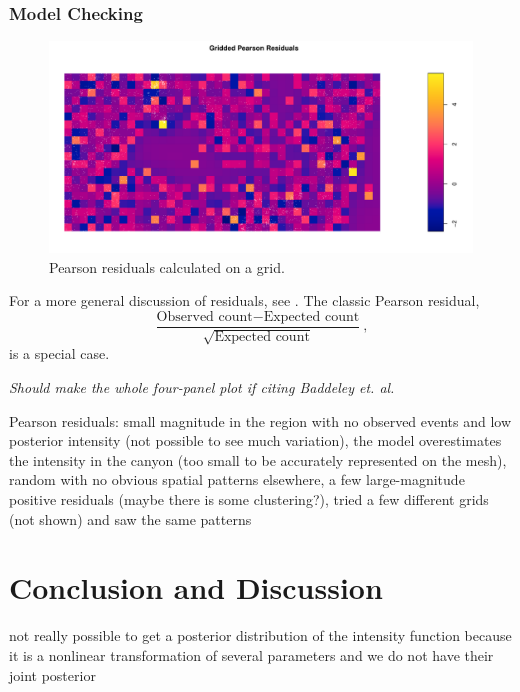 \documentclass[]{interact}
\begin{document}
\subsubsection{Model Checking}

\begin{figure}[h]
\includegraphics[width=\textwidth]{figures/beiresiduals.pdf}
\caption{Pearson residuals calculated on a grid.}
\label{beiresiduals}
\end{figure}

For a more general discussion of residuals, see \cite{baddeleyresiduals}. The
classic Pearson residual,
\begin{displaymath}
\frac{\text{Observed count} - \text{Expected count}}
{\sqrt{\text{Expected count}}},
\end{displaymath}
is a special case.

{\it Should make the whole four-panel plot if citing Baddeley et. al.}

Pearson residuals: small magnitude in the region with no observed events and low
posterior intensity (not possible to see much variation), the model
overestimates the intensity in the canyon (too small to be accurately
represented on the mesh), random with no obvious spatial patterns elsewhere, a
few large-magnitude positive residuals (maybe there is some clustering?), tried
a few different grids (not shown) and saw the same patterns


\section{Conclusion and Discussion}

not really possible to get a posterior distribution of the intensity function
because it is a nonlinear transformation of several parameters and we do not
have their joint posterior
\end{document}
